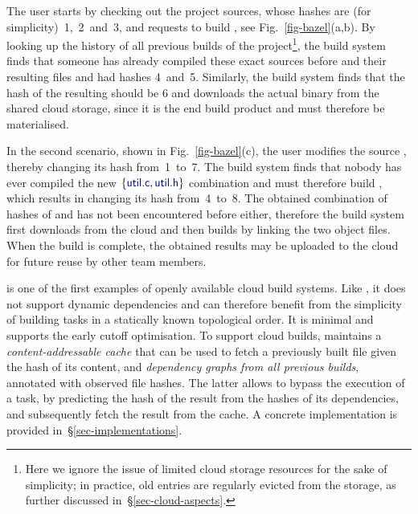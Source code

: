 The user starts by checking out the project sources, whose hashes are (for
simplicity)~1,~2~and~3, and requests to build , see
Fig.~\ref{fig-bazel}(a,b). By looking up the history of all previous builds of
the project\footnote{Here we ignore the issue of limited cloud storage resources
for the sake of simplicity; in practice, old entries are regularly evicted from
the storage, as further discussed in~\S\ref{sec-cloud-aspects}.}, the build
system finds that someone has already compiled these exact sources before and
their resulting files  and  had hashes 4~and~5.
Similarly, the build system finds that the hash of the resulting 
should be 6 and downloads the actual binary from the shared cloud storage, since
it is the end build product and must therefore be materialised.

In the second scenario, shown in Fig.~\ref{fig-bazel}(c), the user modifies the
source , thereby changing its hash from~1~to~7. The build system
finds that nobody has ever compiled the new $\{\cmd{util.c}, \cmd{util.h}\}$
combination and must therefore build , which results in changing its
hash from~4~to~8. The obtained combination of hashes of  and
 has not been encountered before either, therefore the build system
first downloads  from the cloud and then builds  by
linking the two object files. When the build is complete, the obtained results
may be uploaded to the cloud for future reuse by other team members.

\Bazel is one of the first examples of openly available cloud build systems.
Like \Make, it does not support dynamic dependencies and can therefore benefit
from the simplicity of building tasks in a statically known topological order.
It is minimal and supports the early cutoff optimisation. To support cloud
builds, \Bazel maintains a \emph{content-addressable cache} that can be used to
fetch a previously built file given the hash of its content, and
\emph{dependency graphs from all previous builds}, annotated with observed file
hashes. The latter allows to bypass the execution of a task, by predicting the
hash of the result from the hashes of its dependencies, and subsequently
fetch the result from the cache. A concrete implementation is provided
in~\S\ref{sec-implementations}.

